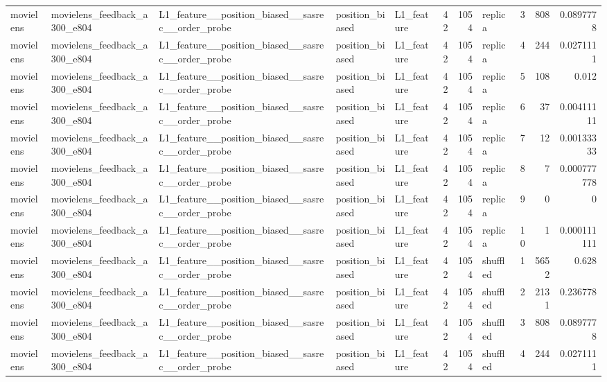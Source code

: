 \begin{table}[htbp!]
\begin{tabular}{lllllrrlrrr}
movielens & movielens\_feedback\_a300\_e804 & L1\_feature\_\_position\_biased\_\_sasrec\_\_order\_probe & position\_biased & L1\_feature & 42 & 1054 & replica & 3 & 808 & 0.0897778 \\
movielens & movielens\_feedback\_a300\_e804 & L1\_feature\_\_position\_biased\_\_sasrec\_\_order\_probe & position\_biased & L1\_feature & 42 & 1054 & replica & 4 & 244 & 0.0271111 \\
movielens & movielens\_feedback\_a300\_e804 & L1\_feature\_\_position\_biased\_\_sasrec\_\_order\_probe & position\_biased & L1\_feature & 42 & 1054 & replica & 5 & 108 & 0.012 \\
movielens & movielens\_feedback\_a300\_e804 & L1\_feature\_\_position\_biased\_\_sasrec\_\_order\_probe & position\_biased & L1\_feature & 42 & 1054 & replica & 6 & 37 & 0.00411111 \\
movielens & movielens\_feedback\_a300\_e804 & L1\_feature\_\_position\_biased\_\_sasrec\_\_order\_probe & position\_biased & L1\_feature & 42 & 1054 & replica & 7 & 12 & 0.00133333 \\
movielens & movielens\_feedback\_a300\_e804 & L1\_feature\_\_position\_biased\_\_sasrec\_\_order\_probe & position\_biased & L1\_feature & 42 & 1054 & replica & 8 & 7 & 0.000777778 \\
movielens & movielens\_feedback\_a300\_e804 & L1\_feature\_\_position\_biased\_\_sasrec\_\_order\_probe & position\_biased & L1\_feature & 42 & 1054 & replica & 9 & 0 & 0 \\
movielens & movielens\_feedback\_a300\_e804 & L1\_feature\_\_position\_biased\_\_sasrec\_\_order\_probe & position\_biased & L1\_feature & 42 & 1054 & replica & 10 & 1 & 0.000111111 \\
movielens & movielens\_feedback\_a300\_e804 & L1\_feature\_\_position\_biased\_\_sasrec\_\_order\_probe & position\_biased & L1\_feature & 42 & 1054 & shuffled & 1 & 5652 & 0.628 \\
movielens & movielens\_feedback\_a300\_e804 & L1\_feature\_\_position\_biased\_\_sasrec\_\_order\_probe & position\_biased & L1\_feature & 42 & 1054 & shuffled & 2 & 2131 & 0.236778 \\
movielens & movielens\_feedback\_a300\_e804 & L1\_feature\_\_position\_biased\_\_sasrec\_\_order\_probe & position\_biased & L1\_feature & 42 & 1054 & shuffled & 3 & 808 & 0.0897778 \\
movielens & movielens\_feedback\_a300\_e804 & L1\_feature\_\_position\_biased\_\_sasrec\_\_order\_probe & position\_biased & L1\_feature & 42 & 1054 & shuffled & 4 & 244 & 0.0271111 \\

\end{tabular}
\end{table}

